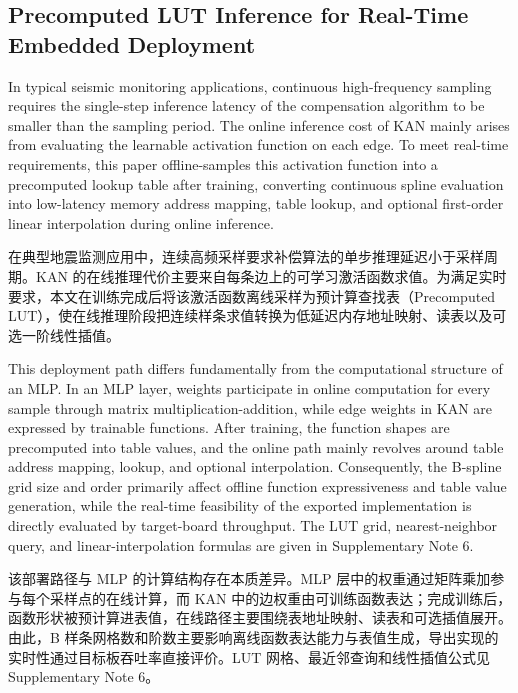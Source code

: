 \documentclass[sn-nature]{sn-jnl}
\newif\ifCNENEnglish
\newif\ifCNENBilingual
\newcommand{\CNEN}[2]{%
    \ifCNENBilingual
        #1%
        \if\relax\detokenize{#2}\relax\else\par #2\fi%
    \else
        \ifCNENEnglish
            #2%
        \else
            #1%
        \fi
    \fi
}
\begin{document}
\subsection{Precomputed LUT Inference for Real-Time Embedded Deployment}

\CNEN{在典型地震监测应用中，连续高频采样要求补偿算法的单步推理延迟小于采样周期。KAN 的在线推理代价主要来自每条边上的可学习激活函数求值。为满足实时要求，本文在训练完成后将该激活函数离线采样为预计算查找表（Precomputed LUT），使在线推理阶段把连续样条求值转换为低延迟内存地址映射、读表以及可选一阶线性插值。}{In typical seismic monitoring applications, continuous high-frequency sampling requires the single-step inference latency of the compensation algorithm to be smaller than the sampling period. The online inference cost of KAN mainly arises from evaluating the learnable activation function on each edge. To meet real-time requirements, this paper offline-samples this activation function into a precomputed lookup table after training, converting continuous spline evaluation into low-latency memory address mapping, table lookup, and optional first-order linear interpolation during online inference.%
}

\CNEN{该部署路径与 MLP 的计算结构存在本质差异。MLP 层中的权重通过矩阵乘加参与每个采样点的在线计算，而 KAN 中的边权重由可训练函数表达；完成训练后，函数形状被预计算进表值，在线路径主要围绕表地址映射、读表和可选插值展开。由此，B 样条网格数和阶数主要影响离线函数表达能力与表值生成，导出实现的实时性通过目标板吞吐率直接评价。LUT 网格、最近邻查询和线性插值公式见 Supplementary Note 6。}{This deployment path differs fundamentally from the computational structure of an MLP. In an MLP layer, weights participate in online computation for every sample through matrix multiplication-addition, while edge weights in KAN are expressed by trainable functions. After training, the function shapes are precomputed into table values, and the online path mainly revolves around table address mapping, lookup, and optional interpolation. Consequently, the B-spline grid size and order primarily affect offline function expressiveness and table value generation, while the real-time feasibility of the exported implementation is directly evaluated by target-board throughput. The LUT grid, nearest-neighbor query, and linear-interpolation formulas are given in Supplementary Note 6.%
}
\FloatBarrier
\end{document}
